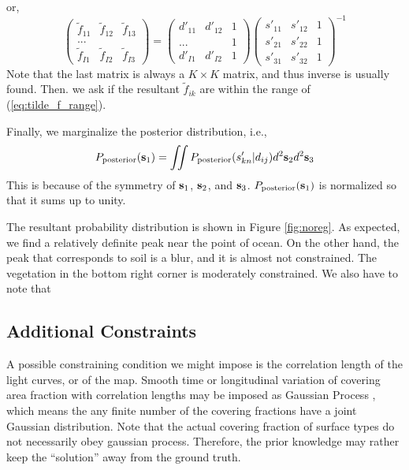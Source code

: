 \documentclass[iop,numberedappendix,apj,]{emulateapj}
\def\fast{\tilde f}
\begin{document}
or,
\begin{equation}
\begin{pmatrix}
\fast_{11} & \fast_{12} & \fast_{13}  \\
... & \\
\fast_{I1} & \fast_{I2} & \fast_{I3}
\end{pmatrix}
=
\begin{pmatrix}
d'_{11} & d'_{12} & 1 \\
... & & 1 \\
d'_{I1} & d'_{I2} & 1 
\end{pmatrix}
\begin{pmatrix}
s'_{11} & s'_{12} & 1 \\
s'_{21} & s'_{22} & 1 \\
s'_{31} & s'_{32} & 1 
\end{pmatrix}^{-1}
\end{equation}
Note that the last matrix is always a $K\times K$ matrix, and thus inverse is usually found. 
Then. we ask if the resultant $\fast_{ik}$ are within the range of (\ref{eq:tilde_f_range}). 

Finally, we marginalize the posterior distribution, i.e.,
\begin{equation} 
P_{\rm posterior} ( {\bf s}_1) = \iint P_{\rm posterior} ( s_{kn}' | d_{ij} ) d^2 {\bf s}_2 d^2 {\bf s}_3
\end{equation}
This is because of the symmetry of ${\bf s}_1$, ${\bf s}_2$, and ${\bf s}_3$. 
$P_{\rm posterior} ( {\bf s}_1) $ is normalized so that it sums up to unity. 

The resultant probability distribution is shown in Figure \ref{fig:noreg}. 
As expected, we find a relatively definite peak near the point of ocean. 
On the other hand, the peak that corresponds to soil is a blur, and it is almost not constrained. 
The vegetation in the bottom right corner is moderately constrained. 
We also have to note that 

\subsection{Additional Constraints}
\label{ss:regularization}

A possible constraining condition we might impose is the correlation length of the light curves, or of the map. 
Smooth time or longitudinal variation of covering area fraction with correlation lengths may be imposed as Gaussian Process \citep{Rasmussen2005}, which means the any finite number of the covering fractions have a joint Gaussian distribution. 
Note that the actual covering fraction of surface types do not necessarily obey gaussian process. 
Therefore, the prior knowledge may rather keep the ``solution'' away from the ground truth. 
\end{document}
